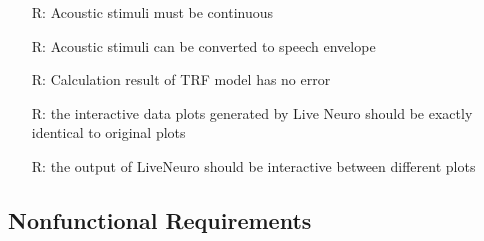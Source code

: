 \documentclass[12pt]{article}
\newcounter{reqnum} %
\begin{document}
\noindent \begin{itemize}

\item[R\refstepcounter{reqnum}\thereqnum \label{R_Inputs}:] Acoustic stimuli must be continuous
\item[R\refstepcounter{reqnum}\thereqnum \label{R_Inputs}:] Acoustic stimuli can be converted to speech envelope



\item[R\refstepcounter{reqnum}\thereqnum \label{R_Calculate}:] Calculation result of TRF model has no error

\item[R\refstepcounter{reqnum}\thereqnum \label{R_VerifyOutput}:] the interactive data plots generated by Live Neuro should be exactly
identical to original plots

\item[R\refstepcounter{reqnum}\thereqnum \label{R_Output}:] the output of LiveNeuro should be interactive between different plots
\end{itemize}
%

\subsection{Nonfunctional Requirements}

\end{document}
